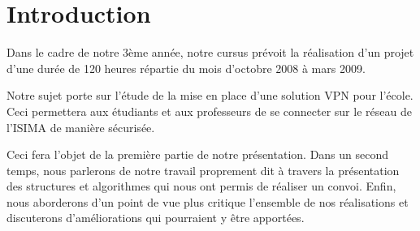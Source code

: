 \section*{Introduction}
Dans le cadre de notre 3ème année, notre cursus prévoit la réalisation d’un projet d’une durée de 120 heures répartie du mois d’octobre 2008 à mars 2009. 

Notre sujet porte sur l'étude de la mise en place d'une solution VPN pour l'école. Ceci permettera aux étudiants et aux professeurs de se connecter sur le réseau de l'ISIMA de manière sécurisée.


Ceci fera l'objet de la première partie de notre présentation. Dans un second temps, nous parlerons de notre travail proprement dit à travers la présentation des structures et algorithmes qui nous ont permis de réaliser un convoi. Enfin, nous aborderons d'un point de vue plus critique l'ensemble de nos réalisations et discuterons d'améliorations qui pourraient y être apportées.


\pagebreak
